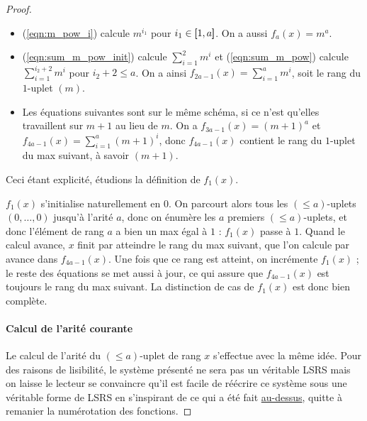 \documentclass{report}
\newcommand{\leqa}{\left( \leqslant a \right)}
\begin{document}
\begin{proof}
			\begin{itemize}
				\item 	(\ref{eqn:m_pow_i}) calcule $m^{i_1}$ pour $i_1 \in \left[\!\!\>\!\left[ 1 , a \right]\!\!\>\!\right]$. On a aussi $f_{a}(x) = m^a$. 
				
				\item 	(\ref{eqn:sum_m_pow_init}) calcule $\sum_{i = 1}^{2} m^i$ et (\ref{eqn:sum_m_pow}) calcule $\sum_{i = 1}^{i_2+2} m^i$ pour $i_2+2 \leqslant a$. On a ainsi $f_{2a-1}(x) = \sum_{i = 1}^{a} m^i$, soit le rang du $1$-uplet $(m)$.
				
				\item 	Les équations suivantes sont sur le même schéma, si ce n'est qu'elles travaillent sur $m+1$ au lieu de $m$. On a $f_{3a-1}(x) = (m+1)^a$ et $f_{4a-1}(x) = \sum_{i = 1}^{a} (m+1)^i$, donc $f_{4a-1}(x)$ contient le rang du $1$-uplet du max suivant, à savoir $(m+1)$. 
			\end{itemize}
			
			Ceci étant explicité, étudions la définition de $f_1(x)$. 
			
			$f_1(x)$ s'initialise naturellement en $0$. On parcourt alors tous les $\leqa$-uplets $(0, \dots, 0)$ jusqu'à l'arité $a$, donc on énumère les $a$ premiers $\leqa$-uplets, et donc l'élément de rang $a$ a bien un max égal à $1$ : $f_1(x)$ passe à $1$. Quand le calcul avance, $x$ finit par atteindre le rang du max suivant, que l'on calcule par avance dans $f_{4a-1}(x)$. Une fois que ce rang est atteint, on incrémente $f_1(x)$ ; le reste des équations se met aussi à jour, ce qui assure que $f_{4a-1}(x)$ est toujours le rang du max suivant. La distinction de cas de $f_1(x)$ est donc bien complète.
			
		\paragraph{Calcul de l'arité courante}
			\label{par:calcul_arite_courante}
			Le calcul de l'arité du $\leqa$-uplet de rang $x$ s'effectue avec la même idée. Pour des raisons de lisibilité, le système présenté ne sera pas un véritable LSRS mais on laisse le lecteur se convaincre qu'il est facile de réécrire ce système sous une véritable forme de LSRS en s'inspirant de ce qui a été fait \hyperref[par:calcul_max_bon_ordre]{au-dessus}, quitte à remanier la numérotation des fonctions. 
			

\end{proof}
\end{document}
